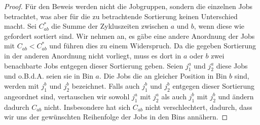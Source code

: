 \documentclass{scrreprt}
\begin{document}
\begin{proof}
    Für den Beweis werden nicht die Jobgruppen, sondern die einzelnen Jobs betrachtet, was aber für die zu betrachtende Sortierung keinen Unterschied macht.
    Sei $C_{ab}^*$ die Summe der Zykluszeiten zwischen $a$ und $b$, wenn diese wie gefordert sortiert sind.
    Wir nehmen an, es gäbe eine andere Anordnung der Jobs mit $C_{ab} < C_{ab}^*$ und führen dies zu einem Widerspruch.
    Da die gegeben Sortierung in der anderen Anordnung nicht vorliegt, muss es dort in $a$ oder $b$ zwei benachbarte Jobs entgegen dieser Sortierung geben.
    Seien $j_1^a$ und $j_2^a$ diese Jobs und o.B.d.A. seien sie in Bin $a$.
    Die Jobs die an gleicher Position in Bin $b$ sind, werden mit $j_1^b$ und $j_2^b$ bezeichnet.
    Falls auch $j_1^b$ und $j_2^b$ entgegen dieser Sortierung angeordnet sind, 
    vertauschen wir sowohl $j_1^a$ mit $j_2^a$ als auch $j_1^b$ mit $j_2^b$ und ändern dadurch $C_{ab}$ nicht.
    Insbesondere hat sich $C_{ab}$ nicht verschlechtert, dadurch, dass wir uns der gewünschten Reihenfolge der Jobs in den Bins annähern.


\end{proof}
\end{document}
